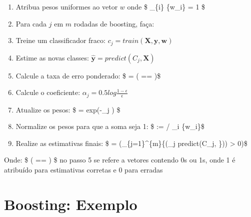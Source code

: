 \documentclass[11pt]{article}
\providecommand{\tightlist}{%
      \setlength{\itemsep}{0pt}\setlength{\parskip}{0pt}}
\begin{document}
\begin{enumerate}
\def\labelenumi{\arabic{enumi}.}
\tightlist
\item
  Atribua pesos uniformes ao vetor \(w\) onde \$ \sum\_\{i\} \{w\_i\} =
  1 \$
\item
  Para cada \(j\) em \(m\) rodadas de boosting, faça:
\item
  Treine um classificador fraco:
  \(c_j = train(\mathbf{X}, \mathbf{y}, \mathbf{w})\)
\item
  Estime as novas classes:
  \(\mathbf{\widehat{y}} = predict(C_j, \mathbf{X})\)
\item
  Calcule a taxa de erro ponderado: \$ \epsilon = 
  \cdot ( == )\$
\item
  Calcule o coeficiente:
  \(\alpha_{j} = 0.5 log \frac{1 - \epsilon}{\epsilon}\)
\item
  Atualize os pesos: \$  =  \times exp(-\alpha\_j
  \times {} \times {}) \$
\item
  Normalize os pesos para que a soma seja 1: \$  := 
  / \sum\_i \{w\_i\}\$
\item
  Realize as estimativas finais: \$  =
  (\sum\_\{j=1\}\^{}\{m\}\{(\alpha\_j \times predict(C\_j,
  \})) \textgreater{} 0)\$
\end{enumerate}

Onde: \$ ( == ) \$ no passo 5 se refere a
vetores contendo 0s ou 1s, onde 1 é atribuído para estimativas corretas
e 0 para erradas

    \hypertarget{boosting-exemplo}{%
\section{Boosting: Exemplo}\label{boosting-exemplo}}
\end{document}
